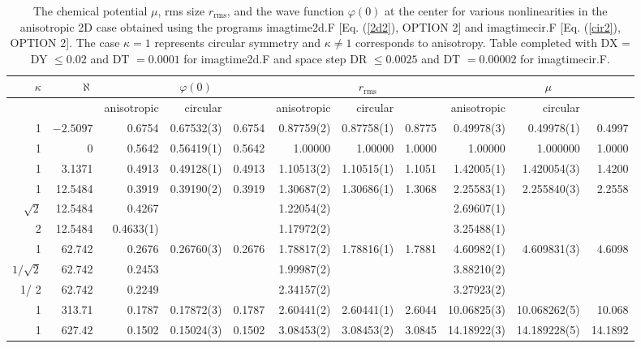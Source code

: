 \documentclass[onecolumn]{elsart3p}
\begin{document}
\begin{table}[!ht]
\begin{center}
\caption{The chemical potential $\mu$, rms size $r_{\mathrm{rms}}$,
and the wave function
$\varphi(0)$ at the center  for various
nonlinearities in the anisotropic  2D case obtained using the programs
imagtime2d.F [Eq. (\ref{2d2}), OPTION 2] and imagtimecir.F [Eq.
(\ref{cir2}), OPTION 2]. The
case $\kappa=1$
represents
circular symmetry and $\kappa\ne 1$ corresponds to anisotropy.
Table completed with
DX = DY $
\le 0.02$
and DT $=0.0001$ for imagtime2d.F and space step DR $\le 0.0025$ and DT $=0.00002$ for
imagtimecir.F. }
\label{table5}
\begin{tabular}{|r|r|r|r|r|r|r|r|r|r|r|}
\hline
$\kappa$ &
{$\aleph$  %
} &
\multicolumn{1}{c}{} &
\multicolumn{1}{c}{$\varphi(0)$} &
      &
\multicolumn{1}{c}{}      &
\multicolumn{1}{c}{$r_{\mathrm{rms}}$} &
&
\multicolumn{1}{c}{}  &
\multicolumn{1}{c}{$\mu $}   &
 \\
\hline
&   & anisotropic &circular &\cite{Bao_Tang} &anisotropic &circular
&\cite{Bao_Tang}
&anisotropic &circular & \cite{Bao_Tang}\\
\hline
1&$-2.5097$ & 0.6754&0.67532(3) &  0.6754 & 0.87759(2)& 0.87758(1) &
0.8775  &
0.49978(3) &0.49978(1)
&
0.4997\\
1&       0 &  0.5642& 0.56419(1)  & 0.5642& 1.00000 & 1.00000
&1.0000 & 1.00000 & 1.000000 &
1.0000
\\
1&    3.1371 &0.4913& 0.49128(1) & 0.4913 &1.10513(2) & 1.10515(1)
&1.1051 & 1.42005(1)
&1.420054(3)  &
1.4200\\
1&   12.5484 & 0.3919& 0.39190(2) & 0.3919 &  1.30687(2)& 1.30686(1)
& 1.3068 &
2.25583(1) &
   2.255840(3)&
2.2558 \\
$\sqrt 2$&   12.5484 & 0.4267&  &  &  1.22054(2) & &  &
2.69607(1) &  &  \\
$ 2$&   12.5484 & 0.4633(1)&  &  &  1.17972(2)  &  & &
3.25488(1) &  &  \\
1&  62.742 & 0.2676&  0.26760(3) &0.2676  & 1.78817(2)&1.78816(1)
&1.7881  &  4.60982(1)
&  4.609831(3)  &
4.6098 \\
$1/\sqrt 2$&  62.742 & 0.2453&  &  & 1.99987(2)& &  &  3.88210(2) &
&
\\
1/ 2&  62.742 & 0.2249&  &  & 2.34157(2)&  & &  3.27923(2) & &    \\
1&313.71 &  0.1787 & 0.17872(3) &0.1787 &  2.60441(2) & 2.60441(1)
&2.6044 &
10.06825(3)&10.068262(5)
&10.068 \\
1&  627.42 & 0.1502 &0.15024(3) &0.1502 & 3.08453(2)  &3.08453(2)
&3.0845 &
14.18922(3)
& 14.189228(5)&
14.1892
\\
\hline
\end{tabular}
\end{center}
\end{table}
\end{document}
